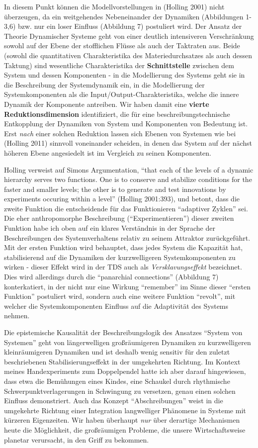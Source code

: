 \documentclass[11pt,a4paper]{article}
\begin{document}
In diesem Punkt können die Modellvorstellungen in (Holling 2001) nicht
überzeugen, da ein weitgehendes Nebeneinander der Dynamiken (Abbildungen
1-3,6) bzw. nur ein loser Einfluss (Abbildung 7) postuliert wird. Der
Ansatz der Theorie Dynamischer Systeme geht von einer deutlich
intensiveren Verschränkung sowohl auf der Ebene der stofflichen Flüsse
als auch der Taktraten aus. Beide (sowohl die quantitativen
Charakteristika des Materiedurchsatzes als auch dessen Taktung) sind
wesentliche Charakteristika der \textbf{Schnittstelle} zwischen dem
System und dessen Komponenten - in die Modellierung des Systems geht sie
in die Beschreibung der Systemdynamik ein, in die Modellierung der
Systemkomponenten als die Input/Output-Charakteristika, welche die
innere Dynamik der Komponente antreiben. Wir haben damit eine
\textbf{vierte Reduktionsdimension} identifiziert, die für eine
beschreibungstechnische Entkopplung der Dynamiken von System und
Komponenten von Bedeutung ist. Erst \emph{nach} einer solchen Reduktion
lassen sich Ebenen von Systemen wie bei (Holling 2011) sinnvoll
voneinander scheiden, in denen das System auf der nächst höheren Ebene
angesiedelt ist im Vergleich zu seinen Komponenten.

Holling verweist auf Simons Argumentation, ``that each of the levels of
a dynamic hierarchy serves two functions. One is to conserve and
stabilize conditions for the faster and smaller levels; the other is to
generate and test innovations by experiments occuring within a level''
(Holling 2001:393), und betont, dass die zweite Funktion die
entscheidende für das Funktionieren ``adaptiver Zyklen'' sei. Die eher
anthropomorphe Beschreibung (``Experimentieren'') dieser zweiten
Funktion habe ich oben auf ein klares Verständnis in der Sprache der
Beschreibungen des Systemverhaltens relativ zu seinem Attraktor
zurückgeführt. Mit der ersten Funktion wird behauptet, dass jedes System
die Kapazität hat, stabilisierend auf die Dynamiken der kurzwelligeren
Systemkomponenten zu wirken - dieser Effekt wird in der TDS auch als
\emph{Versklavungseffekt} bezeichnet. Dies wird allerdings durch die
``panarchial connections'' (Abbildung 7) konterkatiert, in der nicht nur
eine Wirkung ``remember'' im Sinne dieser ``ersten Funktion'' postuliert
wird, sondern auch eine weitere Funktion ``revolt'', mit welcher die
Systemkomponenten Einfluss auf die Adaptivität des Systems nehmen.

Die epistemische Kausalität der Beschreibungslogik des Ansatzes ``System
von Systemen'' geht von längerwelligen großräumigeren Dynamiken zu
kurzwelligeren kleinräumigeren Dynamiken und ist deshalb wenig sensitiv
für den zuletzt beschriebenen Stabilisierungseffekt in der umgekehrten
Richtung. Im Kontext meines Handexperiments zum Doppelpendel hatte ich
aber darauf hingewiesen, dass etwa die Bemühungen eines Kindes, eine
Schaukel durch rhythmische Schwerpunktverlagerungen in Schwingung zu
versetzen, genau einen solchen Einfluss demonstriert. Auch das Konzept
``Abschreibungen'' weist in die umgekehrte Richtung einer Integration
langwelliger Phänomene in Systeme mit kürzeren Eigenzeiten. Wir haben
überhaupt \emph{nur} über derartige Mechanismen heute die Möglichkeit,
die großräumigen Probleme, die unsere Wirtschaftsweise planetar
verursacht, in den Griff zu bekommen.
\end{document}
